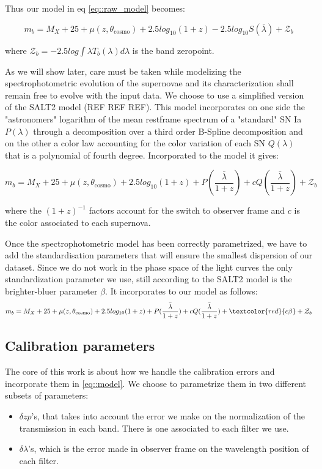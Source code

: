 \documentclass[\docopts]{\docclass}
\begin{document}
Thus our model in eq \ref{eq::raw_model} becomes:
          
\begin{equation}
  m_b = M_X + 25 + \mu(z, \theta_\text{cosmo}) + 2.5log_{10}(1+z) - 2.5 log_{10} S(\bar \lambda) + \mathcal{Z}_b
\end{equation}

where $\mathcal{Z}_b = -2.5 log \int \lambda T_b(\lambda) d\lambda$ is the band zeropoint.

As we will show later, care must be taken while modelizing the spectrophotometric evolution of the supernovae and its characterization shall remain free to evolve with the input data.
We choose to use a simplified version of the SALT2 model (REF REF REF).
This model incorporates on one side the "astronomers" logarithm of the mean restframe spectrum of a "standard" SN Ia $P(\lambda)$ through a decomposition over a third order B-Spline decomposition and on the other a color law accounting for the color variation of each SN $Q(\lambda)$ that is a polynomial of fourth degree.
Incorporated to the model it gives:

\begin{equation}
m_b = M_X + 25 + \mu(z, \theta_\text{cosmo}) + 2.5log_{10}(1+z) + P(\frac{\bar \lambda}{1+z}) + cQ(\frac{\bar \lambda}{1+z})+ \mathcal{Z}_b
\end{equation}

where the $(1+z)^{-1}$ factors account for the switch to observer frame and $c$ is the color associated to each supernova.


Once the spectrophotometric model has been correctly parametrized, we have to add the standardisation parameters that will ensure the smallest dispersion of our dataset.
Since we do not work in the phase space of the light curves the only standardization parameter we use, still according to the SALT2 model is the brighter-bluer parameter $\beta$.
It incorporates to our model as follows:
\begin{equation}
\label{eq::model}
m_b = M_X + 25 + \mu(z, \theta_\text{cosmo}) + 2.5log_{10}(1+z) + P(\frac{\bar \lambda}{1+z}) + cQ(\frac{\bar \lambda}{1+z}) + \textcolor{red}{c\beta}+ \mathcal{Z}_b
\end{equation}


\subsection{Calibration parameters}
\label{sec::calib_uncertainties}
The core of this work is about how we handle the calibration errors and incorporate them in \ref{eq::model}.
We choose to parametrize them in two different subsets of parameters:
\begin{itemize}
\item $\delta zp$'s, that takes into account the error we make on the normalization of the transmission in each band.
There is one associated to each filter we use.
\item $\delta \lambda$'s, which is the error made in observer frame on the wavelength position of each filter. 
\end{itemize}
\end{document}
